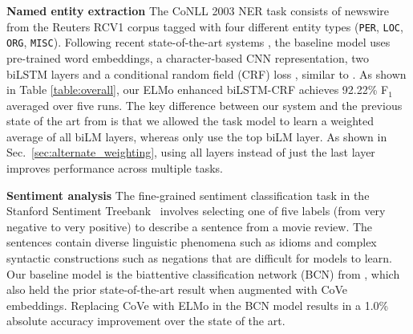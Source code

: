 \documentclass[11pt,a4paper]{article}
\newcommand{\ELMO}{ELMo}
\newcommand{\tinysection}[1]{\textbf{#1}}
\begin{document}
\tinysection{Named entity extraction}
The CoNLL 2003 NER task \citep{CoNLL2003NER} consists of newswire from the Reuters RCV1 corpus tagged with four different entity types (\texttt{PER}, \texttt{LOC}, \texttt{ORG}, \texttt{MISC}).
Following recent state-of-the-art systems \citep{lample-EtAl:2016:N16-1,Peters2017SemisupervisedST}, the baseline model uses pre-trained word embeddings, a character-based CNN representation, two biLSTM layers and a conditional random field (CRF) loss \citep{CRF:Lafferty2001}, similar to \citet{NLPfromScratch:Collobert2011}.
As shown in Table \ref{table:overall}, our \ELMO{} enhanced biLSTM-CRF achieves 92.22\% F$_1$ averaged over five runs.
The key difference between our system and the previous state of the art from \citet{Peters2017SemisupervisedST} is that we allowed the task model to learn a weighted average of all biLM layers, whereas \citet{Peters2017SemisupervisedST} only use the top biLM layer.
As shown in Sec.~\ref{sec:alternate_weighting}, using all layers instead of just the last layer improves performance across multiple tasks.

\tinysection{Sentiment analysis}
The fine-grained sentiment classification task in the Stanford Sentiment Treebank~\citep[SST-5;][]{socher2013recursive} involves selecting one of five labels (from very negative to very positive) to describe a sentence from a movie review.
The sentences contain diverse linguistic phenomena such as idioms and complex syntactic constructions such as negations that are difficult for models to learn.
Our baseline model is the biattentive classification network (BCN) from \citet{McCann2017LearnedIT}, which also held the prior state-of-the-art result when augmented with CoVe embeddings. Replacing CoVe with \ELMO{} in the BCN model results in a 1.0\% absolute accuracy improvement over the state of the art.
\end{document}
